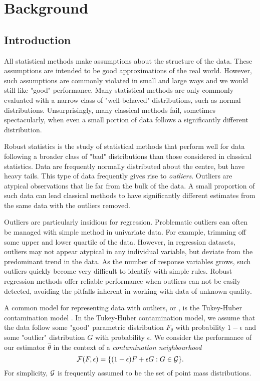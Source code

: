 

\section{Background}

\subsection{Introduction}
All statistical methods make assumptions about the structure of the data. These assumptions are intended to be good approximations of the real world. However, such assumptions are commonly violated in small and large ways and we would still like "good" performance. Many statistical methods are only commonly evaluated with a narrow class of "well-behaved" distributions, such as normal distributions. Unsurprisingly, many classical methods fail, sometimes spectacularly, when even a small portion of data follows a significantly different distribution.

Robust statistics is the study of statistical methods that perform well for data following a broader class of "bad" distributions than those considered in classical statistics. Data are frequently normally distributed about the centre, but have heavy tails. This type of data frequently gives rise to \textit{outliers}. Outliers are atypical observations that lie far from the bulk of the data. A small proportion of such data can lead classical methods to have significantly different estimates from the same data with the outliers removed. 

Outliers are particularly insidious for regression. Problematic outliers can often be managed with simple method in univariate data. For example, trimming off some upper and lower quartile of the data. However, in regression datasets, outliers may not appear atypical in any individual variable, but deviate from the predominant trend in the data. As the number of response variables grows, such outliers quickly become very difficult to identify with simple rules. Robust regression methods offer reliable performance when outliers can not be easily detected, avoiding the pitfalls inherent in working with data of unknown quality.

A common model for representing data with outliers, or , is the Tukey-Huber contamination model \cite{alqallaf2009propagation}. In the Tukey-Huber contamination model, we assume that the data follow some "good" parametric distribution $F_\theta$ with probability $1-\epsilon$ and some "outlier" distribution $G$ with probability $\epsilon$. We consider the performance of our estimator $\hat \theta$ in the context of a \textit{contamination neighbourhood}
\begin{equation}
\label{eq:contamNeigh}
    \mathcal{F}(F,\epsilon) = \{ (1-\epsilon)F + \epsilon G : G \in \mathcal{G} \}.
\end{equation}
For simplicity, $\mathcal{G}$ is frequently assumed to be the set of point mass distributions.


